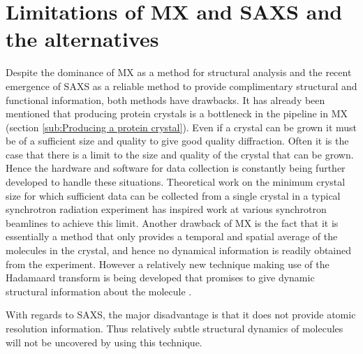 \section{Limitations of MX and SAXS and the alternatives}
\label{sec:Limitations and alternatives to MX and SAXS}
    Despite the dominance of MX as a method for structural analysis and the recent emergence of SAXS as a reliable method to provide complimentary structural and functional information, both methods have drawbacks.
    It has already been mentioned that producing protein crystals is a bottleneck in the pipeline in MX (section \ref{sub:Producing a protein crystal}).
    Even if a crystal can be grown it must be of a sufficient size and quality to give good quality diffraction.
    Often it is the case that there is a limit to the size and quality of the crystal that can be grown.
    Hence the hardware and software for data collection is constantly being further developed to handle these situations.
    Theoretical work on the minimum crystal size for which sufficient data can be collected from a single crystal in a typical synchrotron radiation experiment \cite{holton2010} has inspired work at various synchrotron beamlines to achieve this limit.
    Another drawback of MX is the fact that it is essentially a method that only provides a temporal and spatial average of the molecules in the crystal, and hence no dynamical information is readily obtained from the experiment.
    However a relatively new technique making use of the Hadamaard transform is being developed that promises to give dynamic structural information about the molecule \cite{yorke2014time}.

    With regards to SAXS, the major disadvantage is that it does not provide atomic resolution information.
    Thus relatively subtle structural dynamics of molecules will not be uncovered by using this technique.

